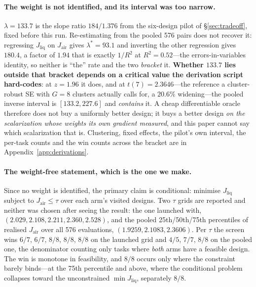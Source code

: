 \documentclass{article}
\newcommand{\Jliq}{J_{\mathrm{liq}}}
\newcommand{\Jair}{J_{\mathrm{air}}}
\begin{document}
\paragraph{The weight is not identified, and its interval was too narrow.}
$\lambda = 133.7$ is the slope ratio $184/1.376$ from the six-design pilot of
\S\ref{sec:tradeoff}, fixed before this run.  Re-estimating from the pooled 576 pairs does
not recover it: regressing $\Jliq$ on $\Jair$ gives $\lambda^* = 93.1$ and inverting the
other regression gives $180.4$, a factor of $1.94$ that is exactly $1/R^2$ at
$R^2 = 0.52$---the errors-in-variables identity, so neither is ``the'' rate and the two
\emph{bracket} it.  \textbf{Whether $133.7$ lies outside that bracket depends on a critical
value the derivation script hard-codes}: at $z = 1.96$ it does, and at $t(7) = 2.3646$---the
reference a cluster-robust SE with $G = 8$ clusters actually calls for, a $20.6\%$
widening---the pooled inverse interval is $[133.2, 227.6]$ and \emph{contains} it.  A cheap
differentiable oracle therefore does not buy a uniformly better design; it buys a better
design \emph{on the scalarization whose weights its own gradient measured}, and this paper
cannot say which scalarization that is.  Clustering, fixed effects, the pilot's own
interval, the per-task counts and the win counts across the bracket are in
Appendix~\ref{app:derivations}.

\paragraph{The weight-free statement, which is the one we make.}
Since no weight is identified, the primary claim is conditional: minimise $\Jliq$
subject to $\Jair \le \tau$ over each arm's visited designs.  Two $\tau$ grids are
reported and neither was chosen after seeing the result: the one launched with,
$(2.029, 2.108, 2.211, 2.360, 2.528)$, and the pooled 25th/50th/75th percentiles of
realised $\Jair$ over all 576 evaluations, $(1.9259, 2.1083, 2.3606)$.  Per $\tau$ the
screen wins $6/7$, $6/7$, $8/8$, $8/8$, $8/8$ on the launched grid and $4/5$, $7/7$,
$8/8$ on the pooled one, the denominator counting only tasks where \emph{both} arms
have a feasible design.  The win is monotone in feasibility, and $8/8$ occurs only
where the constraint barely binds---at the 75th percentile and above, where the
conditional problem collapses toward the unconstrained $\min\Jliq$, separately $8/8$.
\end{document}
